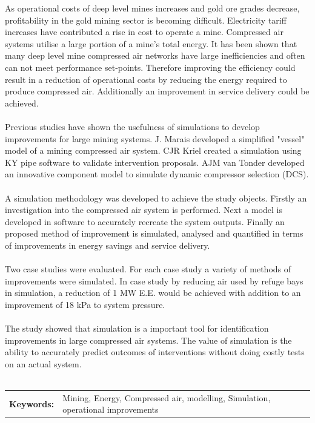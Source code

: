 \documentclass[12pt, english, oneside, open=any]{report}
\begin{document}
	 As operational costs of deep level mines increases and gold ore grades decrease, profitability in the gold mining sector is becoming difficult. Electricity tariff increases have contributed a rise in cost to operate a mine.  Compressed air systems utilise a large portion of a mine's total energy. It has been shown that many deep level mine compressed air networks have large inefficiencies and often can not meet performance set-points. Therefore improving the efficiency could result in a reduction of operational costs by reducing the energy required to produce compressed air. Additionally an improvement in service delivery could be achieved. \\ \\
	Previous studies have shown the usefulness of simulations to develop improvements for large mining systems.  J. Marais developed  a simplified "vessel" model of a mining compressed air system. CJR Kriel created a simulation using KY pipe software to validate intervention proposals. AJM van Tonder developed an innovative component model to simulate dynamic compressor  selection (DCS). \\ \\
	A simulation methodology was developed to achieve the study objects. Firstly an investigation into the compressed air system is performed. Next a model is developed in software to accurately recreate the system outputs. Finally an proposed method of improvement is simulated, analysed and quantified in terms of improvements in energy savings and service delivery.\\ \\
	 Two case studies were evaluated. For each case study a variety of methods of improvements were simulated. In case study by reducing air used by refuge bays in simulation, a reduction of 1 MW E.E. would be achieved with addition to an improvement of 18 kPa to system pressure.\\ \\
	 The study showed that simulation is a important tool for identification improvements in large compressed air systems. The value of simulation is the ability to accurately predict outcomes of interventions without doing costly tests on an actual system. \\ \\
	 \vspace{2cm}
	\begin{tabular}{p{2.35cm}p{13.35cm}}
		\textbf{Keywords:} & Mining, Energy, Compressed air, modelling, Simulation, operational improvements  \\
	\end{tabular}
\clearpage
\end{document}
